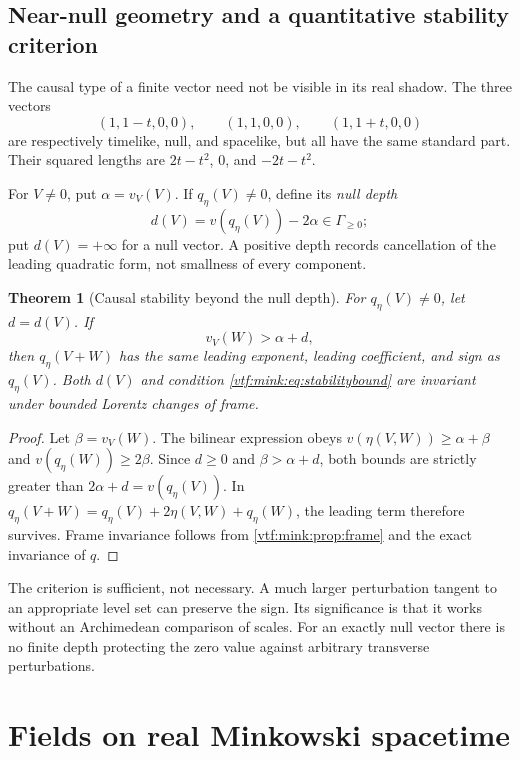 \documentclass[11pt,letterpaper]{article}
\newtheorem{theorem}{Theorem}[section]
\theoremstyle{definition}
\theoremstyle{remark}
\begin{document}
\subsection{Near-null geometry and a quantitative stability criterion}
The causal type of a finite vector need not be visible in its real shadow. The three vectors
\begin{equation}
 (1,1-t,0,0),\qquad(1,1,0,0),\qquad(1,1+t,0,0)
\end{equation}
are respectively timelike, null, and spacelike, but all have the same standard part. Their squared lengths are $2t-t^2$, $0$, and $-2t-t^2$.

For $V\ne0$, put $\alpha=v_V(V)$. If $q_\eta(V)\ne0$, define its \emph{null depth}
\begin{equation}
 d(V)=v(q_\eta(V))-2\alpha\in\Gamma_{\geq0};
\end{equation}
put $d(V)=+\infty$ for a null vector. A positive depth records cancellation of the leading quadratic form, not smallness of every component.

\begin{theorem}[Causal stability beyond the null depth]\label{vtf:mink:thm:causalstability}
For $q_\eta(V)\ne0$, let $d=d(V)$. If
\begin{equation}\label{vtf:mink:eq:stabilitybound}
 v_V(W)>\alpha+d,
\end{equation}
then $q_\eta(V+W)$ has the same leading exponent, leading coefficient, and sign as $q_\eta(V)$. Both $d(V)$ and condition \cref{vtf:mink:eq:stabilitybound} are invariant under bounded Lorentz changes of frame.
\end{theorem}
\begin{proof}
Let $\beta=v_V(W)$. The bilinear expression obeys
$v(\eta(V,W))\geq\alpha+\beta$ and $v(q_\eta(W))\geq2\beta$. Since $d\geq0$ and $\beta>\alpha+d$, both bounds are strictly greater than $2\alpha+d=v(q_\eta(V))$. In
$q_\eta(V+W)=q_\eta(V)+2\eta(V,W)+q_\eta(W)$, the leading term therefore survives. Frame invariance follows from \cref{vtf:mink:prop:frame} and the exact invariance of $q$.
\end{proof}
The criterion is sufficient, not necessary. A much larger perturbation tangent to an appropriate level set can preserve the sign. Its significance is that it works without an Archimedean comparison of scales. For an exactly null vector there is no finite depth protecting the zero value against arbitrary transverse perturbations.

\section{Fields on real Minkowski spacetime}\label{vtf:mink:sec:fields}
\end{document}
